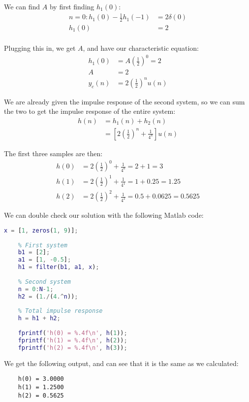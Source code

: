 \documentclass{article}
\begin{document}
We can find $A$ by first finding $h_1(0)$:
\begin{align*}
    n=0: h_1(0) - \frac{1}{2}h_1(-1) &= 2\delta(0) \\
    h_1(0) &= 2 \\
\end{align*}

Plugging this in, we get $A$, and have our characteristic equation:
\begin{align*}
    h_1(0) &= A\left(\frac{1}{2}\right)^0 = 2 \\
    A &= 2 \\
    y_c(n) &= 2\left(\frac{1}{2}\right)^nu(n)
\end{align*}

We are already given the impulse response of the second system, so we can sum the two to get the impulse response of the entire system:
\begin{align*}
    h(n) &= h_1(n) + h_2(n) \\ 
    &= \left[2\left(\frac{1}{2}\right)^n + \frac{1}{4^n}\right]u(n)
\end{align*}

The first three samples are then:
\begin{align*}
    h(0) &= 2\left(\frac{1}{2}\right)^0 + \frac{1}{4^0} = 2 + 1 = 3 \\
    h(1) &= 2\left(\frac{1}{2}\right)^1 + \frac{1}{4^1} = 1 + 0.25 = 1.25 \\
    h(2) &= 2\left(\frac{1}{2}\right)^2 + \frac{1}{4^2} = 0.5 + 0.0625 = 0.5625
\end{align*}


We can double check our solution with the following Matlab code:
\begin{lstlisting}[language=Matlab]
    x = [1, zeros(1, 9)];
    
    % First system
    b1 = [2];
    a1 = [1, -0.5];
    h1 = filter(b1, a1, x);
    
    % Second system
    n = 0:N-1;
    h2 = (1./(4.^n));
    
    % Total impulse response
    h = h1 + h2;
    
    fprintf('h(0) = %.4f\n', h(1));
    fprintf('h(1) = %.4f\n', h(2));
    fprintf('h(2) = %.4f\n', h(3));
\end{lstlisting}

We get the following output, and can see that it is the same as we calculated:
\begin{verbatim}
    h(0) = 3.0000
    h(1) = 1.2500
    h(2) = 0.5625
\end{verbatim}
\end{document}

